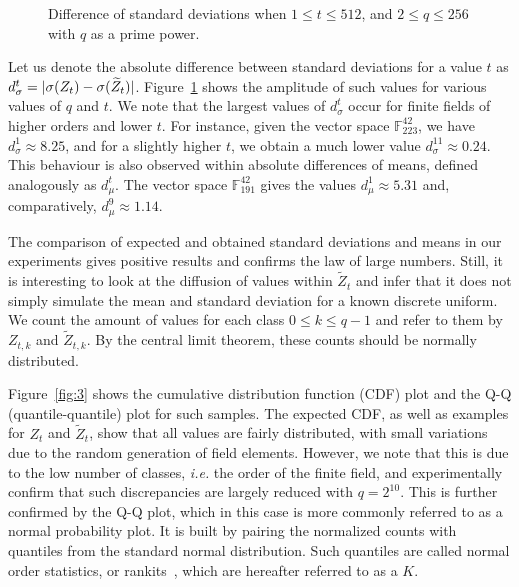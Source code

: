 \documentclass[draft, 12pt, a4paper, oneside]{memoir}
\DeclarePairedDelimiter\abs{\lvert}{\rvert}
\theoremstyle{definition}
\begin{document}
\begin{figure}[ht]
  \subfloat[
    $d_{\sigma}^{t}$ for $n = 42, v_{1} = 17$.\label{fig:2a}
  ]{
  }
  \subfloat[
    $d_{\sigma}^{t}$ for $n = 90, v_{1} = 35$.\label{fig:2b}
  ]{
  }
  \caption{Difference of standard deviations when $1 \leq t \leq 512$,
    and $2 \leq q \leq 256$ with $q$ as a prime power.}\label{fig:2}
\end{figure}

Let us denote the absolute difference between standard deviations for a value
$t$ as $d_{\sigma}^{t} = \abs{\sigma(Z_{t}) - \sigma(\widetilde{Z}_{t})}$.
Figure~\ref{fig:2} shows the amplitude of such values for various values of $q$
and $t$. We note that the largest values of $d_{\sigma}^{t}$ occur for finite
fields of higher orders and lower $t$. For instance, given the vector space
$\mathbb{F}_{223}^{42}$, we have $d_{\sigma}^{1} \approx 8.25$, and for a
slightly higher $t$, we obtain a much lower value
$d_{\sigma}^{11} \approx 0.24$. This behaviour is also observed within absolute
differences of means, defined analogously as $d_{\mu}^{t}$. The vector space
$\mathbb{F}_{191}^{42}$ gives the values $d_{\mu}^{1} \approx 5.31$ and,
comparatively, $d_{\mu}^{9} \approx 1.14$.

The comparison of expected and obtained standard deviations and means in our
experiments gives positive results and confirms the law of large numbers.
Still, it is interesting to look at the diffusion of values within
$\widetilde{Z}_{t}$ and infer that it does not simply simulate the mean and
standard deviation for a known discrete uniform. We count the amount of values
for each class $0 \leq k \leq q - 1$ and refer to them by $Z_{t, k}$ and
$\widetilde{Z}_{t, k}$. By the central limit theorem, these counts should be
normally distributed.

Figure~\ref{fig:3} shows the cumulative distribution function (CDF) plot and
the Q-Q (quantile-quantile) plot for such samples. The expected CDF, as well as
examples for $Z_{t}$ and $\widetilde{Z}_{t}$, show that all values are fairly
distributed, with small variations due to the random generation of field
elements. However, we note that this is due to the low number of classes,
\emph{i.e.} the order of the finite field, and experimentally confirm that such
discrepancies are largely reduced with $q = 2^{10}$. This is further confirmed
by the Q-Q plot, which in this case is more commonly referred to as a normal probability plot. It is built by pairing the normalized counts with quantiles from the standard normal distribution. Such quantiles are called normal order statistics, or rankits~\cite{Ipsen:194405}, which are hereafter referred to as a $K$. 
\end{document}
